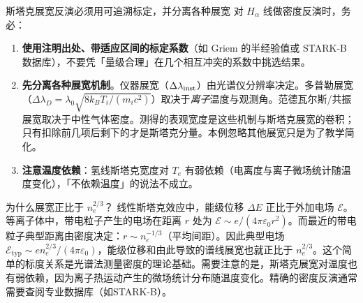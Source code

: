 \documentclass[12pt,a4paper,openany,oneside]{book}
\newcommand{\eps}{\varepsilon}
\begin{document}
\begin{warning}{斯塔克展宽反演必须用可追溯标定，并分离各种展宽}{}
对 $H_\alpha$ 线做密度反演时，务必：
\begin{enumerate}
    \item \textbf{使用注明出处、带适应区间的标定系数}（如 Griem 的半经验值或 STARK-B 数据库），不要凭「量级合理」在几个相互冲突的系数中挑选结果。
    \item \textbf{先分离各种展宽机制}。仪器展宽（$\Delta\lambda_{\rm inst}$）由光谱仪分辨率决定。多普勒展宽（$\Delta\lambda_D = \lambda_0\sqrt{8k_BT_i/(m_ic^2)}$）取决于\emph{离子}温度与观测角。范德瓦尔斯/共振展宽取决于中性气体密度。测得的表观宽度是这些机制与斯塔克展宽的卷积；只有扣除前几项后剩下的才是斯塔克分量。本例忽略其他展宽只是为了教学简化。
    \item \textbf{注意温度依赖}：氢线斯塔克宽度对 $T_e$ 有弱依赖（电离度与离子微场统计随温度变化），「不依赖温度」的说法不成立。
\end{enumerate}
\end{warning}

\begin{insight}{为什么展宽正比于 $n_e^{2/3}$？}{}
线性斯塔克效应中，能级位移 $\Delta E$ 正比于外加电场 $\mathcal{E}$。等离子体中，带电粒子产生的电场在距离 $r$ 处为 $\mathcal{E} \sim e/(4\pi\eps_0 r^2)$。而最近的带电粒子典型距离由密度决定：$r \sim n_e^{-1/3}$（平均间距）。因此典型电场 $\mathcal{E}_{\mathrm{typ}} \sim e n_e^{2/3}/(4\pi\eps_0)$，能级位移和由此导致的谱线展宽也就正比于 $n_e^{2/3}$。这个简单的标度关系是光谱法测量密度的理论基础。需要注意的是，斯塔克展宽对温度也有弱依赖，因为离子热运动产生的微场统计分布随温度变化。精确的密度反演通常需要查阅专业数据库（如STARK-B）。
\end{insight}
\end{document}
